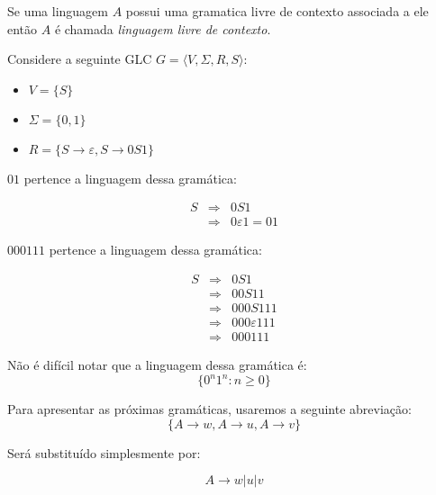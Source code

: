 Se uma linguagem $A$ possui uma gramatica livre de contexto associada a ele então $A$ é chamada {\em linguagem livre de contexto}.

\begin{example}
Considere a seguinte GLC $G = \langle V, \Sigma, R, S \rangle$:
\begin{itemize}
\item $V = \{S\}$
\item $\Sigma = \{0, 1\}$
\item $R = \{S \to \varepsilon, S \to 0S1\}$
\end{itemize}

$01$ pertence a linguagem dessa gramática:


\begin{eqnarray*}
  S & \Rightarrow & 0S1 \\
    & \Rightarrow & 0 \varepsilon 1 = 01  
\end{eqnarray*}

$000111$ pertence a linguagem dessa gramática:


\begin{eqnarray*}
  S & \Rightarrow & 0S1\\
    & \Rightarrow & 00S11\\
    & \Rightarrow & 000S111\\
    & \Rightarrow & 000\varepsilon 111\\
    & \Rightarrow & 000111  
\end{eqnarray*}

Não é difícil notar que a linguagem dessa gramática é:
\begin{displaymath}
  \{0^n 1^n : n \geq 0 \}
\end{displaymath}
\end{example}

Para apresentar as próximas gramáticas, usaremos a seguinte abreviação:
\begin{displaymath}
  \{A \to w, A \to u, A \to v\}
\end{displaymath}

Será substituído simplesmente por:

\begin{displaymath}
  A \to w | u | v
\end{displaymath}

